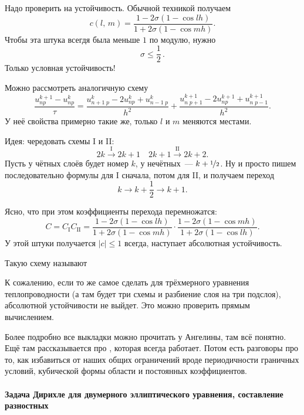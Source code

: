 \documentclass{trlnotes}
\begin{document}
	Надо проверить на устойчивость. Обычной техникой получаем
	\[
		c(l, \, m) = \dfrac{1 - 2\sigma(1 - \cos lh)}{1 + 2\sigma(1 - \cos mh)}.
	\]
	Чтобы эта штука всегдя была меньше $1$ по модулю, нужно
	\[
		\boxed{\sigma \leqslant \dfrac{1}{2}}\,.
	\]
	Только условная устойчивость!

	Можно рассмотреть аналогичную схему
	\[
		\dfrac{u^{k+1}_{np} - u^{k}_{np}}{\tau} = \dfrac{u^{k}_{n+1 \; p} - 2u^{k}_{np} + u^{k}_{n-1 \; p}}{h^2} + \dfrac{u^{k+1}_{n \; p+1} - 2u^{k+1}_{np} + u^{k+1}_{n \; p - 1}}{h^2}.
	\]
	У неё свойства примерно такие же, только $l$ и $m$ меняются местами.

	Идея: чередовать схемы I и II:
	\[
		2k \xrightarrow{\text{I}} 2k+1 \quad 2k+1 \xrightarrow{\text{II}} 2k+2.
	\]
	Пусть у чётных слоёв будет номер $k$, у нечётных~--- $k + \nicefrac{1}{2}$. Ну и просто пишем последовательно формулы для I сначала, потом для II, и получаем переход
	\[
		k \to k+ \frac{1}{2} \to k+1.
	\]

	Ясно, что при этом коэффициенты перехода перемножатся:
	\[
		C = C_{\text{I}} C_{\text{II}} = \dfrac{1 - 2\sigma(1 - \cos lh)}{1 + 2\sigma(1 - \cos mh)} \cdot \dfrac{1 - 2\sigma(1 - \cos mh)}{1 + 2\sigma(1 - \cos lh)}.
	\]
	У этой штуки получается $|c| \leqslant 1$ всегда, наступает абсолютная устойчивость.

	Такую схему называют 

	\begin{rem}
		К сожалению, если то же самое сделать для трёхмерного уравнения теплопроводности (а там будет три схемы и разбиение слоя на три подслоя), абсолютной устойчивости не выйдет. Это можно проверить прямым вычислением.
	\end{rem}

	\begin{rem}
		Более подробно все выкладки можно прочитать у Ангелины, там всё понятно. Ещё там рассказывается про , которая всегда работает. Потом есть разговоры про то, как избавиться от наших общих ограничений вроде периодичности граничных условий, кубической формы области и постоянных коэффициентов.
	\end{rem}



	\paragraph{Задача Дирихле для двумерного эллиптического уравнения, составление разностных}
	\label{par:pde::elldirprobl}
\end{document}
